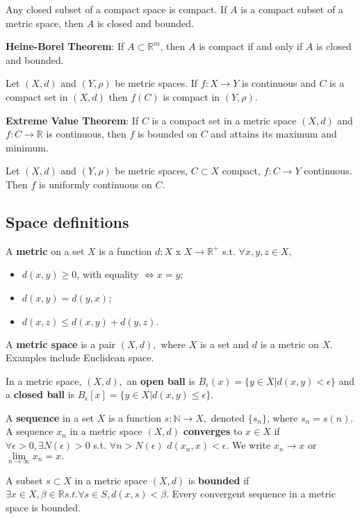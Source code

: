 \documentclass[11pt]{article} %
\begin{document}
Any closed subset of a compact space is compact. If $A$ is a compact subset of a metric space, then $A$ is closed and bounded.

\textbf{Heine-Borel Theorem}: If $A \subset \mathbb{R}^m$, then $A$ is compact if and only if $A$ is closed and bounded.

Let $(X,d)$ and $(Y,\rho)$ be metric spaces. If $f: X \rightarrow Y$ is continuous and $C$ is a compact set in $(X,d)$ then $f(C)$ is compact in $(Y,\rho).$

\textbf{Extreme Value Theorem}: If $C$ is a compact set in a metric space $(X,d)$ and $f:C \rightarrow \mathbb{R}$ is continuous, then $f$ is bounded on $C$ and attains its maximum and minimum.

Let $(X,d)$ and $(Y,\rho)$ be metric spaces, $C \subset X$ compact, $f:C \rightarrow Y$ continuous. Then $f$ is uniformly continuous on $C$.

\subsection{Space definitions}

A \textbf{metric} on a set $X$ is a function $d: X $ x $ X \rightarrow \mathbb{R}^+$ s.t. $\forall x,y,z \in X,$
\begin{itemize}
\item $d(x,y) \geq 0$, with equality $\iff x = y;$
\item $d(x,y) = d(y,x)$;
\item $d(x,z) \leq d(x,y) + d(y,z).$
\end{itemize}
A \textbf{metric space} is a pair $(X,d),$ where $X$ is a set and $d$ is a metric on $X$. Examples include Euclidean space.

In a metric space, $(X,d),$ an \textbf{open ball} is $B_\epsilon(x) = \{ y \in X| d(x,y) < \epsilon\}$ and a \textbf{closed ball} is $B_\epsilon[x] = \{ y \in X| d(x,y) \leq \epsilon\}$.

A \textbf{sequence} in a set $X$ is a function $s: \mathbb{N} \rightarrow X,$ denoted $\{ s_n\}$, where $s_n = s(n)$. A sequence $x_n$ in a metric space $(X,d)$ \textbf{converges} to $x \in X$ if $\forall \epsilon >0, \exists N(\epsilon)>0$ s.t. $\forall n>N(\epsilon)$ $d(x_n,x) < \epsilon.$ We write $x_n \rightarrow x$ or $\lim\limits_{n \rightarrow \infty} x_n = x.$

A subset $s \subset X$ in a metric space $(X,d)$ is \textbf{bounded} if $\exists x \in X, \beta \in \mathbb{R} s.t. \forall s \in S, d(x,s) < \beta.$ Every convergent sequence in a metric space is bounded.
\end{document}
